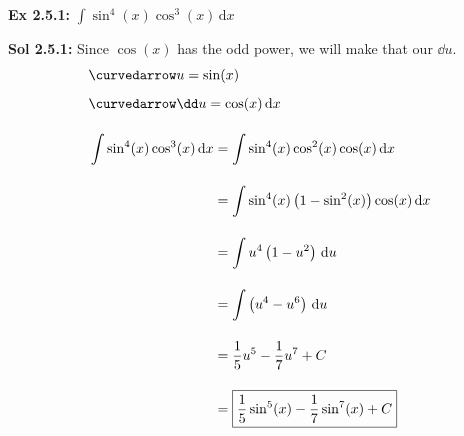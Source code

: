 \begin{tcolorbox}[example]
    \textbf{Ex 2.5.1: } $\int \sin^4 (x)\cos^3 (x) \,\mathrm{d}x$
\end{tcolorbox}
\begin{tcolorbox}[solution]
    \textbf{Sol 2.5.1: } Since $\cos (x)$ has the odd power, we will make that our $\dd u$. \begin{align*}
        & \curvedarrow u = \sin (x) \\[5.5pt]
        & \curvedarrow \dd u = \cos (x) \,\mathrm{d}x \\[11pt]
        & \int \sin^4 (x)\cos^3 (x) \,\mathrm{d}x \begin{aligned}[t]
            & = \int \sin^4 (x)\cos^2 (x)\cos (x) \,\mathrm{d}x \\[11pt]
            & = \int \sin^4 (x)\left(1 - \sin^2 (x)\right)\cos (x) \,\mathrm{d}x \\[11pt]
            & = \int u^4\left(1 - u^2\right) \,\mathrm{d}u \\[11pt]
            & = \int \left(u^4 - u^6\right) \,\mathrm{d}u \\[11pt]
            & = \dfrac{1}{5}u^5 - \dfrac{1}{7}u^7 + C \\[11pt]
            & = \boxed{\dfrac{1}{5}\sin^5 (x) - \dfrac{1}{7}\sin^7 (x) + C}
        \end{aligned}
    \end{align*}
\end{tcolorbox} \vspace{11pt}

